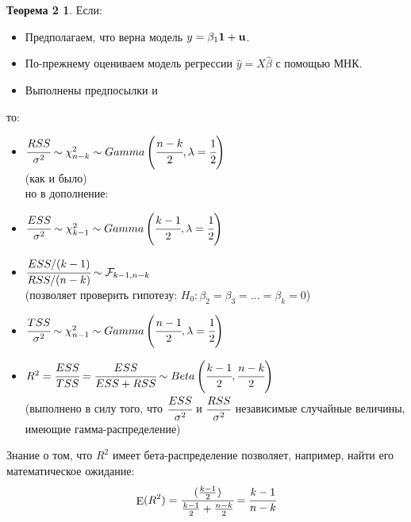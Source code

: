 \documentclass[12pt]{article} %
\theoremstyle{definition} %
\DeclareMathOperator{\E}{E}
\def \hb{\hat{\beta}}
\def \hy{\hat{y}}
\def \cF{\mathcal{F}}
\def \cChi{\mathcal{\chi}}
\begin{document}
\newtheorem*{theo_nn}{Теорема 2}
\begin{theo_nn}

    Если:
    \begin{itemize}
        \item \text{[ТГМ1'] } Предполагаем, что верна модель $y=\beta_1 \bf{1} +u$.
        \item \text{[ТГМ2] } По-прежнему оцениваем модель регрессии $\hy = X\hb$ с помощью МНК.
        \item Выполнены предпосылки \text{[ТГМ3-5] } и \text{[нормальность] }
    \end{itemize}

    то:
    \begin{itemize}
        \item $\cfrac{RSS}{\sigma^2} \sim \cChi_{n-k}^2 \sim Gamma\left(\cfrac{n-k}{2}, \lambda=\cfrac{1}{2}\right)$ \\
        (как и было) \\
        но в дополнение:
        \item $\cfrac{ESS}{\sigma^2} \sim \cChi_{k-1}^2 \sim Gamma\left(\cfrac{k-1}{2}, \lambda=\cfrac{1}{2}\right)$
        \item $\cfrac{ESS/(k - 1)}{RSS/(n-k)} \sim \cF_{k - 1, n-k}$ \\
        (позволяет проверить гипотезу: $H_0: \beta_2 = \beta_3 =...=\beta_k=0$)
        \item $\cfrac{TSS}{\sigma^2} \sim \cChi_{n-1}^2 \sim Gamma\left(\cfrac{n-1}{2}, \lambda=\cfrac{1}{2}\right)$
        \item $R^2 = \cfrac{ESS}{TSS} = \cfrac{ESS}{ESS+RSS} \sim Beta\left(\cfrac{k-1}{2}, \cfrac{n-k}{2}\right)$ \\
        (выполнено в силу того, что $\cfrac{ESS}{\sigma^2}$ и $\cfrac{RSS}{\sigma^2}$ независимые случайные величины, имеющие гамма-распределение)
    \end{itemize}

\end{theo_nn}

Знание о том, что $R^2$ имеет бета-распределение позволяет, например, найти его математическое ожидание:
    \[
        \E(R^2) = \cfrac{(\frac{k-1}{2})}{\frac{k-1}{2}+\frac{n-k}{2}} = \cfrac{k-1}{n-k}
    \]
\end{document}
